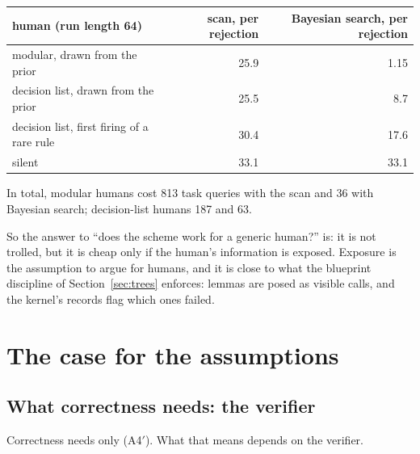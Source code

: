\documentclass[11pt]{article}
\theoremstyle{definition}
\theoremstyle{remark}
\begin{document}
\begin{center}\small
\begin{tabular}{@{}lrr@{}}
\toprule
human (run length 64) & scan, per rejection & Bayesian search, per rejection \\
\midrule
modular, drawn from the prior & 25.9 & 1.15 \\
decision list, drawn from the prior & 25.5 & 8.7 \\
decision list, first firing of a rare rule & 30.4 & 17.6 \\
silent & 33.1 & 33.1 \\
\bottomrule
\end{tabular}
\end{center}
In total, modular humans cost 813 task queries with the scan and 36 with Bayesian search; decision-list humans 187 and 63.

So the answer to ``does the scheme work for a generic human?'' is: it is not trolled, but it is cheap only if the human's information is exposed. Exposure is the assumption to argue for humans, and it is close to what the blueprint discipline of Section~\ref{sec:trees} enforces: lemmas are posed as visible calls, and the kernel's records flag which ones failed.

\section{The case for the assumptions}\label{sec:case}

\subsection{What correctness needs: the verifier}

Correctness needs only (A4$'$). What that means depends on the verifier.
\end{document}
